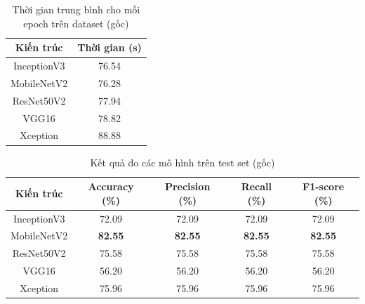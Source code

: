 \documentclass[a4paper,14pt]{extarticle}
\begin{document}
		\begin{table}[H]
			\centering
			\begin{tabular}{|c|c|}
			\hline
			Kiến trúc   & Thời gian (s) \\ \hline
			InceptionV3 & 76.54         \\
			MobileNetV2 & 76.28         \\
			ResNet50V2  & 77.94         \\
			VGG16       & 78.82         \\
			Xception    & 88.88         \\ \hline
			\end{tabular}
			\caption{Thời gian trung bình cho mỗi epoch trên dataset (gốc)}
		\end{table}

		\begin{table}[H]
			\centering
			\begin{tabular}{|c|c|c|c|c|}
			\hline
			Kiến trúc   & Accuracy (\%)  & Precision (\%) & Recall (\%)    & F1-score (\%)  \\ \hline
			InceptionV3 & 72.09          & 72.09          & 72.09          & 72.09          \\
			MobileNetV2 & \textbf{82.55} & \textbf{82.55} & \textbf{82.55} & \textbf{82.55} \\
			ResNet50V2  & 75.58          & 75.58          & 75.58          & 75.58          \\
			VGG16       & 56.20          & 56.20          & 56.20          & 56.20          \\
			Xception    & 75.96          & 75.96          & 75.96          & 75.96          \\ \hline
			\end{tabular}
			\caption{Kết quả đo các mô hình trên test set (gốc)}
		\end{table}
\end{document}
